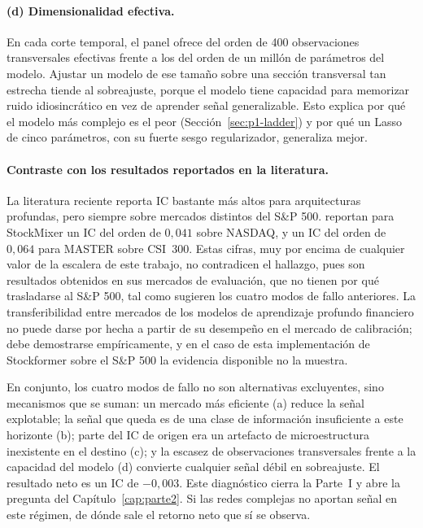 \paragraph{(d) Dimensionalidad efectiva.} En cada corte temporal, el panel ofrece del
orden de 400 observaciones transversales efectivas frente a los del orden de un millón de
parámetros del modelo. Ajustar un modelo de ese tamaño sobre una sección transversal tan
estrecha tiende al sobreajuste, porque el modelo tiene capacidad para memorizar ruido
idiosincrático en vez de aprender señal generalizable. Esto explica por qué el modelo más
complejo es el peor (Sección~\ref{sec:p1-ladder}) y por qué un Lasso de cinco parámetros,
con su fuerte sesgo regularizador, generaliza mejor.

\paragraph{Contraste con los resultados reportados en la literatura.} La literatura
reciente reporta IC bastante más altos para arquitecturas profundas, pero siempre sobre
mercados distintos del S\&P 500. \textcite{fan2024stockmixer} reportan para StockMixer un
IC del orden de $0{,}041$ sobre NASDAQ, y \textcite{li2024master} un IC del orden de
$0{,}064$ para MASTER sobre CSI~300. Estas cifras, muy por encima de cualquier valor de la
escalera de este trabajo, no contradicen el hallazgo, pues son resultados obtenidos en sus
mercados de evaluación, que no tienen por qué trasladarse al S\&P 500, tal como sugieren
los cuatro modos de fallo anteriores. La transferibilidad entre mercados de los modelos de
aprendizaje profundo financiero no puede darse por hecha a partir de su desempeño en el
mercado de calibración; debe demostrarse empíricamente, y en el caso de esta
implementación de Stockformer sobre el S\&P 500 la evidencia disponible no la muestra.

En conjunto, los cuatro modos de fallo no son alternativas excluyentes, sino mecanismos
que se suman: un mercado más eficiente (a) reduce la señal explotable; la señal que queda
es de una clase de información insuficiente a este horizonte (b); parte del IC de origen
era un artefacto de microestructura inexistente en el destino (c); y la escasez de
observaciones transversales frente a la capacidad del modelo (d) convierte cualquier señal
débil en sobreajuste. El resultado neto es un IC de $-0{,}003$. Este diagnóstico cierra la
Parte~I y abre la pregunta del Capítulo~\ref{cap:parte2}. Si las redes complejas no
aportan señal en este régimen, de dónde sale el retorno neto que sí se observa.
